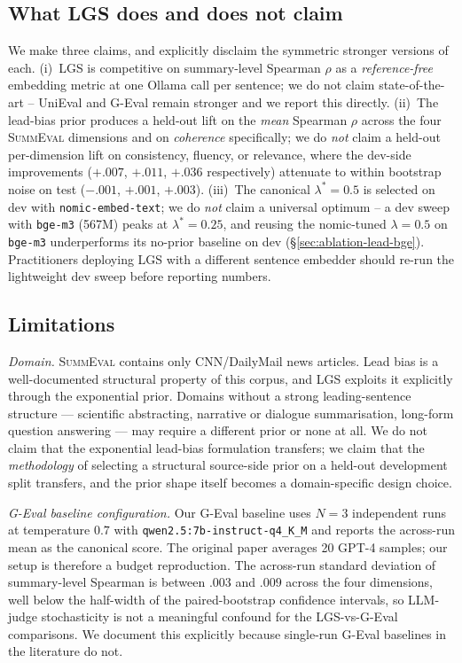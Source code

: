 \documentclass[journal]{IEEEtran}
\begin{document}
\subsection{What LGS does and does not claim}
We make three claims, and explicitly disclaim the symmetric
stronger versions of each. (i)~LGS is competitive on summary-level
Spearman $\rho$ as a \emph{reference-free} embedding metric at one
Ollama call per sentence; we do not claim state-of-the-art --
UniEval and G-Eval remain stronger and we report this directly.
(ii)~The lead-bias prior produces a held-out lift on the
\emph{mean} Spearman $\rho$ across the four \textsc{SummEval}
dimensions and on \emph{coherence} specifically; we do
\emph{not} claim a held-out per-dimension lift on consistency,
fluency, or relevance, where the dev-side improvements
($+.007$, $+.011$, $+.036$ respectively) attenuate to within
bootstrap noise on test ($-.001$, $+.001$, $+.003$). (iii)~The
canonical $\lambda^* = 0.5$ is selected on dev with
\texttt{nomic-embed-text}; we do \emph{not} claim a universal
optimum -- a dev sweep with \texttt{bge-m3} (567M) peaks at
$\lambda^* = 0.25$, and reusing the nomic-tuned $\lambda = 0.5$
on \texttt{bge-m3} underperforms its no-prior baseline on dev
(\S\ref{sec:ablation-lead-bge}). Practitioners deploying LGS
with a different sentence embedder should re-run the lightweight
dev sweep before reporting numbers.

\subsection{Limitations}
\label{sec:limitations}
\textit{Domain.} \textsc{SummEval} contains only CNN/DailyMail news
articles. Lead bias is a well-documented structural property of
this corpus, and LGS exploits it explicitly through the
exponential prior. Domains without a strong leading-sentence
structure --- scientific abstracting, narrative or dialogue
summarisation, long-form question answering --- may require a
different prior or none at all. We do not claim that the
exponential lead-bias formulation transfers; we claim that the
\emph{methodology} of selecting a structural source-side prior on
a held-out development split transfers, and the prior shape
itself becomes a domain-specific design choice.

\textit{G-Eval baseline configuration.} Our G-Eval baseline uses
$N\!=\!3$ independent runs at temperature $0.7$ with
\texttt{qwen2.5:7b-instruct-q4\_K\_M} and reports the across-run
mean as the canonical score. The original paper averages 20
GPT-4 samples; our setup is therefore a budget reproduction.
The across-run standard deviation of summary-level Spearman is
between $.003$ and $.009$ across the four dimensions, well below
the half-width of the paired-bootstrap confidence intervals, so
LLM-judge stochasticity is not a meaningful confound for the
LGS-vs-G-Eval comparisons. We document this explicitly because
single-run G-Eval baselines in the literature do not.
\end{document}
